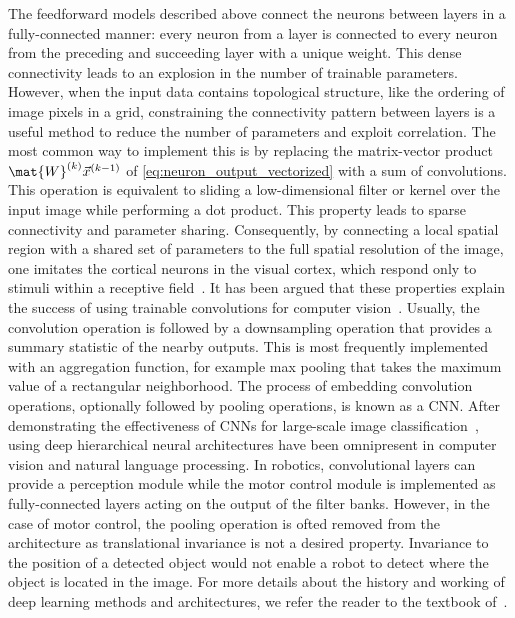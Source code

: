 The feedforward models described above connect the neurons between layers in a fully-connected manner: every neuron from a layer is connected to every neuron from the preceding and succeeding layer with a unique weight. This dense connectivity leads to an explosion in the number of trainable parameters. However, when the input data contains topological structure, like the ordering of image pixels in a grid, constraining the connectivity pattern between layers is a useful method to reduce the number of parameters and exploit correlation. The most common way to implement this is by replacing the matrix-vector product $\mat{W}^{(k)} \vec{x}^{(k-1)}$ of \cref{eq:neuron_output_vectorized} with a sum of convolutions. This operation is equivalent to sliding a low-dimensional filter or kernel over the input image while performing a dot product. This property leads to sparse connectivity and parameter sharing. Consequently, by connecting a local spatial region with a shared set of parameters to the full spatial resolution of the image, one imitates the cortical neurons in the visual cortex, which respond only to stimuli within a receptive field~\autocite{hubel1959receptive}. It has been argued that these properties explain the success of using trainable convolutions for computer vision~\autocite{Goodfellow2016}. Usually, the convolution operation is followed by a downsampling operation that provides a summary statistic of the nearby outputs. This is most frequently implemented with an aggregation function, for example max pooling that takes the maximum value of a rectangular neighborhood. The process of embedding convolution operations, optionally followed by pooling operations, is known as a \gls{CNN}. After demonstrating the effectiveness of \glspl{CNN} for large-scale image classification~\autocite{Krizhevsky2012}, using deep hierarchical neural architectures have been omnipresent in computer vision and natural language processing. In robotics, convolutional layers can provide a perception module while the motor control module is implemented as fully-connected layers acting on the output of the filter banks. However, in the case of motor control, the pooling operation is ofted removed from the architecture as translational invariance is not a desired property. Invariance to the position of a detected object would not enable a robot to detect where the object is located in the image. For more details about the history and working of deep learning methods and architectures, we refer the reader to the textbook of~\textcite{Goodfellow2016}.
